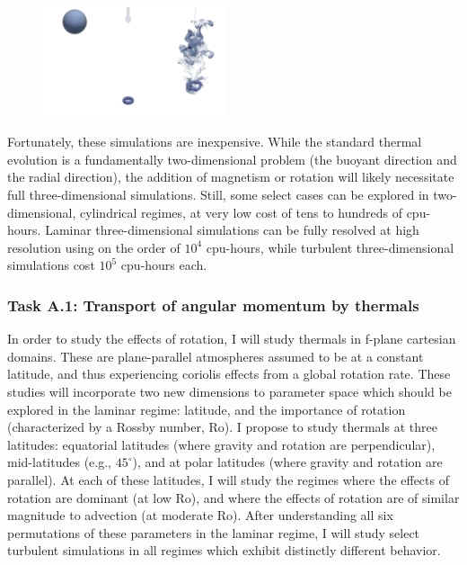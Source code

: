 \documentclass[aasms,12pt]{article}
\begin{document}
\begin{figure}
	\begin{center}
    \includegraphics[width=0.48\textwidth]{./figs/thermals_comparison.png}
	\end{center}
    \caption{
	\label{fig:thermals_comparison} }
\end{figure}

Fortunately, these simulations are inexpensive.
While the standard thermal evolution is a fundamentally two-dimensional problem (the buoyant direction and the radial direction), the addition of magnetism or rotation will likely necessitate full three-dimensional simulations.
Still, some select cases can be explored in two-dimensional, cylindrical regimes, at very low cost of tens to hundreds of cpu-hours.
Laminar three-dimensional simulations can be fully resolved at high resolution using on the order of $10^4$ cpu-hours, while turbulent three-dimensional simulations cost $10^5$ cpu-hours each.

\subsubsection{Task A.1: Transport of angular momentum by thermals}
In order to study the effects of rotation, I will study thermals in f-plane cartesian domains.
These are plane-parallel atmospheres assumed to be at a constant latitude, and thus experiencing coriolis effects from a global rotation rate.
These studies will incorporate two new dimensions to parameter space which should be explored in the laminar regime: latitude, and the importance of rotation (characterized by a Rossby number, Ro).
I propose to study thermals at three latitudes: equatorial latitudes (where gravity and rotation are perpendicular), mid-latitudes (e.g., $45^\circ$), and at polar latitudes (where gravity and rotation are parallel).
At each of these latitudes, I will study the regimes where the effects of rotation are dominant (at low Ro), and where the effects of rotation are of similar magnitude to advection (at moderate Ro).
After understanding all six permutations of these parameters in the laminar regime, I will study select turbulent simulations in all regimes which exhibit distinctly different behavior.
\end{document}
